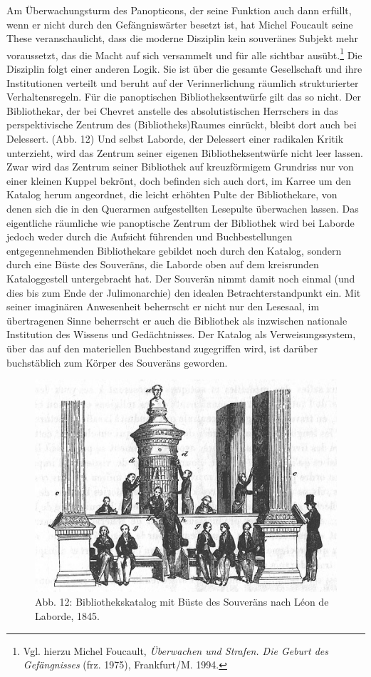 Am Überwachungsturm des Panopticons, der seine Funktion auch dann
erfüllt, wenn er nicht durch den Gefängniswärter besetzt ist, hat Michel
Foucault seine These veranschaulicht, dass die moderne Disziplin kein
souveränes Subjekt mehr voraussetzt, das die Macht auf sich versammelt
und für alle sichtbar ausübt.\footnote{Vgl. hierzu Michel Foucault,
  \emph{Überwachen und Strafen. Die Geburt des Gefängnisses} (frz.
  1975), Frankfurt/M. 1994.} Die Disziplin folgt einer anderen Logik.
Sie ist über die gesamte Gesellschaft und ihre Institutionen verteilt
und beruht auf der Verinnerlichung räumlich strukturierter
Verhaltensregeln. Für die panoptischen Bibliotheksentwürfe gilt das so
nicht. Der Bibliothekar, der bei Chevret anstelle des absolutistischen
Herrschers in das perspektivische Zentrum des (Bibliotheks)Raumes
einrückt, bleibt dort auch bei Delessert. (Abb. 12) Und selbst Laborde,
der Delessert einer radikalen Kritik unterzieht, wird das Zentrum seiner
eigenen Bibliotheksentwürfe nicht leer lassen. Zwar wird das Zentrum
seiner Bibliothek auf kreuzförmigem Grundriss nur von einer kleinen
Kuppel bekrönt, doch befinden sich auch dort, im Karree um den Katalog
herum angeordnet, die leicht erhöhten Pulte der Bibliothekare, von denen
sich die in den Querarmen aufgestellten Lesepulte überwachen lassen. Das
eigentliche räumliche wie panoptische Zentrum der Bibliothek wird bei
Laborde jedoch weder durch die Aufsicht führenden und Buchbestellungen
entgegennehmenden Bibliothekare gebildet noch durch den Katalog, sondern
durch eine Büste des Souveräns, die Laborde oben auf dem kreisrunden
Kataloggestell untergebracht hat. Der Souverän nimmt damit noch einmal
(und dies bis zum Ende der Julimonarchie) den idealen
Betrachterstandpunkt ein. Mit seiner imaginären Anwesenheit beherrscht
er nicht nur den Lesesaal, im übertragenen Sinne beherrscht er auch die
Bibliothek als inzwischen nationale Institution des Wissens und
Gedächtnisses. Der Katalog als Verweisungssystem, über das auf den
materiellen Buchbestand zugegriffen wird, ist darüber buchstäblich zum
Körper des Souveräns geworden.

\begin{figure}[htbp]
\centering
\includegraphics{img/wagner-12.jpg}
\caption*{Abb. 12: Bibliothekskatalog mit Büste des Souveräns nach Léon
de Laborde, 1845.}
\end{figure}

